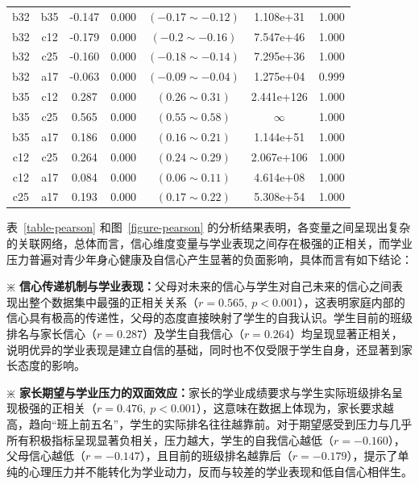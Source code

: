 \documentclass[zihao = -4, linespread = 1.5]{article}
\begin{document}
\begin{table}[htbp]
\begin{tabular}{ccccccc}
            b32 & b35 & -0.147 & 0.000 & $(-0.17\sim-0.12)$ & 1.108e+31 & 1.000 \\
            b32 & c12 & -0.179 & 0.000 & $(-0.2\sim-0.16)$ & 7.547e+46 & 1.000 \\
            b32 & c25 & -0.160 & 0.000 & $(-0.18\sim-0.14)$ & 7.295e+36 & 1.000 \\
            b32 & a17 & -0.063 & 0.000 & $(-0.09\sim-0.04)$ & 1.275e+04 & 0.999 \\
            b35 & c12 & 0.287 & 0.000 & $(0.26\sim0.31)$ & 2.441e+126 & 1.000 \\
            b35 & c25 & 0.565 & 0.000 & $(0.55\sim0.58)$ & $\infty$ & 1.000 \\
            b35 & a17 & 0.186 & 0.000 & $(0.16\sim0.21)$ & 1.144e+51 & 1.000 \\
            c12 & c25 & 0.264 & 0.000 & $(0.24\sim0.29)$ & 2.067e+106 & 1.000 \\
            c12 & a17 & 0.084 & 0.000 & $(0.06\sim0.11)$ & 4.614e+08 & 1.000 \\
            c25 & a17 & 0.193 & 0.000 & $(0.17\sim0.22)$ & 5.308e+54 & 1.000 \\
            \toprule[1.5pt]
        \end{tabular}
\end{table}

表~\ref{table-pearson} 和图~\ref{figure-pearson} 的分析结果表明，各变量之间呈现出复杂的关联网络，总体而言，信心维度变量与学业表现之间存在极强的正相关，而学业压力普遍对青少年身心健康及自信心产生显著的负面影响，具体而言有如下结论：

$\divideontimes$ \textbf{信心传递机制与学业表现：}父母对未来的信心与学生对自己未来的信心之间表现出整个数据集中最强的正相关关系（$r=0.565,\ p<0.001$），这表明家庭内部的信心具有极高的传递性，父母的态度直接映射了学生的自我认识。学生目前的班级排名与家长信心（$r=0.287$）及学生自我信心（$r=0.264$）均呈现显著正相关，说明优异的学业表现是建立自信的基础，同时也不仅受限于学生自身，还显著到家长态度的影响。

$\divideontimes$ \textbf{家长期望与学业压力的双面效应：}家长的学业成绩要求与学生实际班级排名呈现极强的正相关（$r=0.476,\ p<0.001$），这意味在数据上体现为，家长要求越高，趋向“班上前五名”，学生的实际排名往往越靠前。对于期望感受到压力与几乎所有积极指标呈现显著负相关，压力越大，学生的自我信心越低（$r=-0.160$），父母信心越低（$r=-0.147$），且目前的班级排名越靠后（$r=-0.179$），提示了单纯的心理压力并不能转化为学业动力，反而与较差的学业表现和低自信心相伴生。
\end{document}
